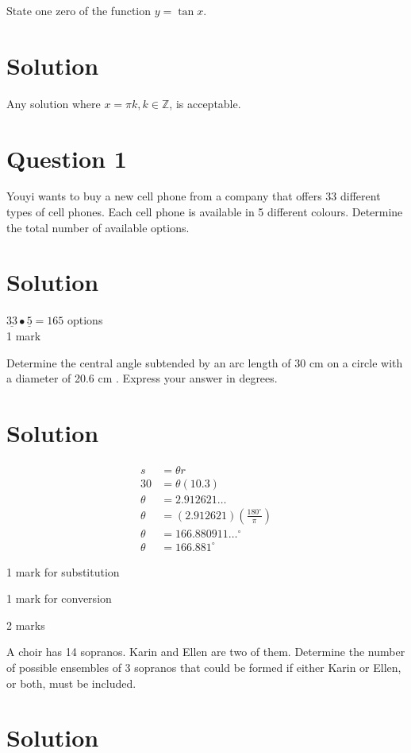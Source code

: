 \documentclass[10pt]{article}
\begin{document}
State one zero of the function $y=\tan x$.

\section*{Solution}
Any solution where $x=\pi k, k \in \mathbb{Z}$, is acceptable.

\section*{Question 1}
Youyi wants to buy a new cell phone from a company that offers 33 different types of cell phones. Each cell phone is available in 5 different colours. Determine the total number of available options.

\section*{Solution}
$\underline{33} \bullet \underline{5}=165$ options\\
1 mark

Determine the central angle subtended by an arc length of 30 cm on a circle with a diameter of 20.6 cm . Express your answer in degrees.

\section*{Solution}
$$
\begin{aligned}
s & =\theta r \\
30 & =\theta(10.3) \\
\theta & =2.912621 \ldots \\
\theta & =(2.912621)\left(\frac{180^{\circ}}{\pi}\right) \\
\theta & =166.880911 \ldots{ }^{\circ} \\
\theta & =166.881^{\circ}
\end{aligned}
$$

1 mark for substitution

1 mark for conversion

2 marks

A choir has 14 sopranos. Karin and Ellen are two of them. Determine the number of possible ensembles of 3 sopranos that could be formed if either Karin or Ellen, or both, must be included.

\section*{Solution}
\end{document}
